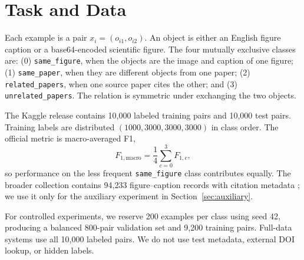 \documentclass[11pt]{article}
\newcommand{\sfclass}{\texttt{same\_figure}}
\newcommand{\spclass}{\texttt{same\_paper}}
\newcommand{\rpclass}{\texttt{related\_papers}}
\newcommand{\upclass}{\texttt{unrelated\_papers}}
\begin{document}
\section{Task and Data}

Each example is a pair $x_i=(o_{i1},o_{i2})$.  An object is either an English figure caption or a base64-encoded scientific figure.  The four mutually exclusive classes are: (0) \sfclass{}, when the objects are the image and caption of one figure; (1) \spclass{}, when they are different objects from one paper; (2) \rpclass{}, when one source paper cites the other; and (3) \upclass{}.  The relation is symmetric under exchanging the two objects.

The Kaggle release contains 10,000 labeled training pairs and 10,000 test pairs.  Training labels are distributed $(1000,3000,3000,3000)$ in class order.  The official metric is macro-averaged F1,
\begin{equation}
F_{1,\mathrm{macro}}=\frac{1}{4}\sum_{c=0}^{3}F_{1,c},
\end{equation}
so performance on the less frequent \sfclass{} class contributes equally.  The broader collection contains 94,233 figure--caption records with citation metadata \citep{astroclimbdataset2026}; we use it only for the auxiliary experiment in Section~\ref{sec:auxiliary}.

For controlled experiments, we reserve 200 examples per class using seed 42, producing a balanced 800-pair validation set and 9,200 training pairs.  Full-data systems use all 10,000 labeled pairs.  We do not use test metadata, external DOI lookup, or hidden labels.
\end{document}
